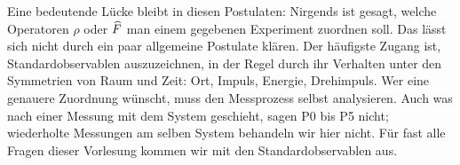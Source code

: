 Eine bedeutende Lücke bleibt in diesen Postulaten: Nirgends ist gesagt, welche Operatoren $\rho$ oder $\widehat{F}$ man einem gegebenen Experiment zuordnen soll. Das lässt sich nicht durch ein paar allgemeine Postulate klären. Der häufigste Zugang ist, Standardobservablen auszuzeichnen, in der Regel durch ihr Verhalten unter den Symmetrien von Raum und Zeit: Ort, Impuls, Energie, Drehimpuls. Wer eine genauere Zuordnung wünscht, muss den Messprozess selbst analysieren. Auch was nach einer Messung mit dem System geschieht, sagen P0 bis P5 nicht; wiederholte Messungen am selben System behandeln wir hier nicht. Für fast alle Fragen dieser Vorlesung kommen wir mit den Standardobservablen aus.

